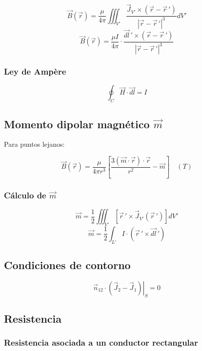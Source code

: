 \documentclass[12pt,a4paper]{article}
\begin{document}
\[ \vec{B} ( \vec{r} ) = \frac{\mu}{4 \pi} \iiint_{V'} \frac{ \vec{J}_{V'} \times ( \vec{r} - \vec{r}\,' )}{| \vec{r} - \vec{r}\,' |^3} dV' \]
\[ \vec{B} ( \vec{r} ) = \frac{\mu I}{4 \pi} \cdot \frac{ \vec{dl}\,' \times ( \vec{r} - \vec{r}\,' )}{| \vec{r} - \vec{r}\,' |^3} \]

\subsubsection{Ley de Ampère}
\label{ssub:ley_de_ampere}

\[ \oint_C \vec{H} \cdot \vec{dl} = I \]

\subsection{Momento dipolar magnético $ \vec{m} $ }
\label{sub:momento_dipolar_magnetico_m}

Para puntos lejanos:

\[ \vec{B} ( \vec{r} ) = \frac{\mu}{4 \pi r^3} \left[ \frac{3 ( \vec{m} \cdot \vec{r} ) \cdot \vec{r}}{ r^2} - \vec{m} \right] \quad (T) \]

\subsubsection{Cálculo de $ \vec{m} $ }
\label{ssub:calculo_de_m}

\[ \vec{m} = \frac{1}{2} \iiint_{V'} \left[ \vec{r}\,' \times \vec{J}_{V'} ( \vec{r}\,' ) \right] dV' \]
\[ \vec{m} = \frac{1}{2} \int_{L'} I \cdot \left( \vec{r}\,' \times \vec{dl}\,' \right) \]


\subsection{Condiciones de contorno}
\label{sub:condiciones_de_contorno}

\[ \vec{n}_{12} \cdot \left.( \vec{J}_2 - \vec{J}_1 ) \right|_S = 0 \]

\subsection{Resistencia}
\label{sub:resistencia}

\subsubsection{Resistencia asociada a un conductor rectangular}
\label{ssub:resistencia_asociada_a_un_conductor_rectangular}
\end{document}
